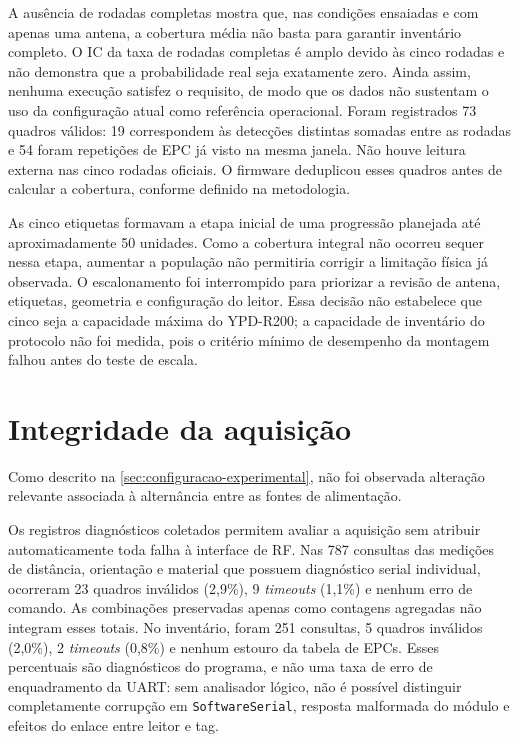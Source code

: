 \FloatBarrier

A ausência de rodadas completas mostra que, nas condições ensaiadas e com apenas uma antena, a cobertura média não basta para garantir inventário completo. O IC da taxa de rodadas completas é amplo devido às cinco rodadas e não demonstra que a probabilidade real seja exatamente zero. Ainda assim, nenhuma execução satisfez o requisito, de modo que os dados não sustentam o uso da configuração atual como referência operacional. Foram registrados 73 quadros válidos: 19 correspondem às detecções distintas somadas entre as rodadas e 54 foram repetições de EPC já visto na mesma janela. Não houve leitura externa nas cinco rodadas oficiais. O firmware deduplicou esses quadros antes de calcular a cobertura, conforme definido na metodologia.

As cinco etiquetas formavam a etapa inicial de uma progressão planejada até aproximadamente 50 unidades. Como a cobertura integral não ocorreu sequer nessa etapa, aumentar a população não permitiria corrigir a limitação física já observada. O escalonamento foi interrompido para priorizar a revisão de antena, etiquetas, geometria e configuração do leitor. Essa decisão não estabelece que cinco seja a capacidade máxima do YPD-R200; a capacidade de inventário do protocolo não foi medida, pois o critério mínimo de desempenho da montagem falhou antes do teste de escala.

\section{Integridade da aquisição}

Como descrito na \autoref{sec:configuracao-experimental}, não foi observada alteração relevante associada à alternância entre as fontes de alimentação.

Os registros diagnósticos coletados permitem avaliar a aquisição sem atribuir automaticamente toda falha à interface de RF. Nas 787 consultas das medições de distância, orientação e material que possuem diagnóstico serial individual, ocorreram 23 quadros inválidos (2,9\%), 9 \textit{timeouts} (1,1\%) e nenhum erro de comando. As combinações preservadas apenas como contagens agregadas não integram esses totais. No inventário, foram 251 consultas, 5 quadros inválidos (2,0\%), 2 \textit{timeouts} (0,8\%) e nenhum estouro da tabela de EPCs. Esses percentuais são diagnósticos do programa, e não uma taxa de erro de enquadramento da UART: sem analisador lógico, não é possível distinguir completamente corrupção em \texttt{SoftwareSerial}, resposta malformada do módulo e efeitos do enlace entre leitor e tag.

